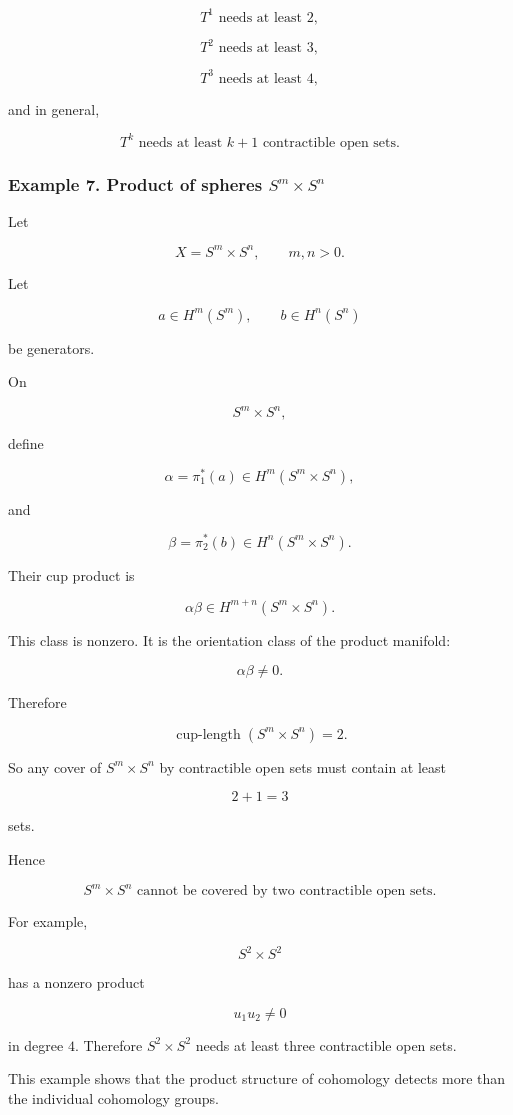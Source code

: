 \documentclass[12pt,a4paper]{article}
\theoremstyle{notespace}
\begin{document}
\[
T^1\text{ needs at least }2,
\]

\[
T^2\text{ needs at least }3,
\]

\[
T^3\text{ needs at least }4,
\]

and in general,

\[
\boxed{
	T^k\text{ needs at least }k+1\text{ contractible open sets.}
}
\]

\subsubsection{Example 7. Product of spheres \(S^m\times S^n\)}

Let

\[
X=S^m\times S^n,
\qquad
m,n>0.
\]

Let

\[
a\in H^m(S^m),
\qquad
b\in H^n(S^n)
\]

be generators.

On

\[
S^m\times S^n,
\]

define

\[
\alpha=\pi_1^*(a)\in H^m(S^m\times S^n),
\]

and

\[
\beta=\pi_2^*(b)\in H^n(S^m\times S^n).
\]

Their cup product is

\[
\alpha\beta\in H^{m+n}(S^m\times S^n).
\]

This class is nonzero. It is the orientation class of the product manifold:

\[
\alpha\beta\neq 0.
\]

Therefore

\[
\operatorname{cup\text{-}length}(S^m\times S^n)=2.
\]

So any cover of \(S^m\times S^n\) by contractible open sets must contain at least

\[
2+1=3
\]

sets.

Hence

\[
\boxed{
	S^m\times S^n\text{ cannot be covered by two contractible open sets.}
}
\]

For example,

\[
S^2\times S^2
\]

has a nonzero product

\[
u_1u_2\neq 0
\]

in degree \(4\). Therefore \(S^2\times S^2\) needs at least three contractible open sets.

This example shows that the product structure of cohomology detects more than the individual cohomology groups.
\end{document}
